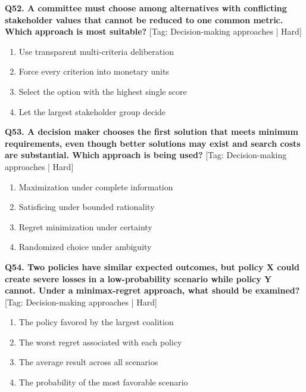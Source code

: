 \noindent\textbf{Q52. A committee must choose among alternatives with conflicting stakeholder values that cannot be reduced to one common metric. Which approach is most suitable?} \hfill [Tag: Decision-making approaches | Hard]
\begin{enumerate}[label=(\alph*),topsep=2pt,itemsep=1pt,partopsep=0pt,parsep=0pt]
    \item {Use transparent multi-criteria deliberation}
    \item {Force every criterion into monetary units}
    \item {Select the option with the highest single score}
    \item {Let the largest stakeholder group decide}
\end{enumerate}
\vspace{2mm}

\noindent\textbf{Q53. A decision maker chooses the first solution that meets minimum requirements, even though better solutions may exist and search costs are substantial. Which approach is being used?} \hfill [Tag: Decision-making approaches | Hard]
\begin{enumerate}[label=(\alph*),topsep=2pt,itemsep=1pt,partopsep=0pt,parsep=0pt]
    \item {Maximization under complete information}
    \item {Satisficing under bounded rationality}
    \item {Regret minimization under certainty}
    \item {Randomized choice under ambiguity}
\end{enumerate}
\vspace{2mm}

\noindent\textbf{Q54. Two policies have similar expected outcomes, but policy X could create severe losses in a low-probability scenario while policy Y cannot. Under a minimax-regret approach, what should be examined?} \hfill [Tag: Decision-making approaches | Hard]
\begin{enumerate}[label=(\alph*),topsep=2pt,itemsep=1pt,partopsep=0pt,parsep=0pt]
    \item {The policy favored by the largest coalition}
    \item {The worst regret associated with each policy}
    \item {The average result across all scenarios}
    \item {The probability of the most favorable scenario}
\end{enumerate}
\vspace{2mm}

